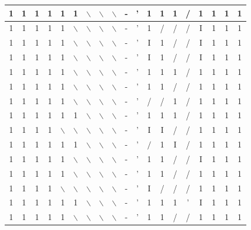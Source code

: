 \documentclass[10pt]{article}
\begin{document}
\begin{center}
\begin{tabular}{|c|c|c|c|c|c|c|c|c|c|c|c|c|c|c|c|c|c|c|}
\hline
1 & 1 & 1 & 1 & 1 & 1 & $\backslash$ & $\backslash$ & $\backslash$ & - & ' & 1 & 1 & 1 & / & 1 & 1 & 1 & 1 \\
\hline
1 & 1 & 1 & 1 & 1 & $\backslash$ & $\backslash$ & $\backslash$ & $\backslash$ & - & ' & 1 & / & / & / & I & 1 & 1 & 1 \\
\hline
1 & 1 & 1 & 1 & 1 & $\backslash$ & $\backslash$ & $\backslash$ & $\backslash$ & - & ' & I & 1 & / & / & I & 1 & 1 & 1 \\
\hline
1 & 1 & 1 & 1 & 1 & $\backslash$ & $\backslash$ & $\backslash$ & $\backslash$ & - & ' & I & 1 & / & / & I & 1 & 1 & 1 \\
\hline
1 & 1 & 1 & 1 & 1 & $\backslash$ & $\backslash$ & $\backslash$ & $\backslash$ & - & ' & 1 & 1 & 1 & / & 1 & 1 & 1 & 1 \\
\hline
1 & 1 & 1 & 1 & 1 & $\backslash$ & $\backslash$ & $\backslash$ & $\backslash$ & - & ' & 1 & 1 & / & / & 1 & 1 & 1 & 1 \\
\hline
1 & 1 & 1 & 1 & 1 & $\backslash$ & $\backslash$ & $\backslash$ & $\backslash$ & - & ' & / & / & 1 & / & 1 & 1 & 1 & 1 \\
\hline
1 & 1 & 1 & 1 & 1 & 1 & $\backslash$ & $\backslash$ & $\backslash$ & - & ' & 1 & 1 & 1 & / & 1 & 1 & 1 & 1 \\
\hline
1 & 1 & 1 & 1 & $\backslash$ & $\backslash$ & $\backslash$ & $\backslash$ & $\backslash$ & - & ' & I & I & / & / & 1 & 1 & 1 & 1 \\
\hline
1 & 1 & 1 & 1 & 1 & 1 & $\backslash$ & $\backslash$ & $\backslash$ & - & ' & $/$ & 1 & I & / & 1 & 1 & 1 & 1 \\
\hline
1 & 1 & 1 & 1 & 1 & $\backslash$ & $\backslash$ & $\backslash$ & $\backslash$ & - & ' & 1 & 1 & / & / & I & 1 & 1 & 1 \\
\hline
1 & 1 & 1 & 1 & 1 & $\backslash$ & $\backslash$ & $\backslash$ & $\backslash$ & - & ' & 1 & 1 & / & / & 1 & 1 & 1 & 1 \\
\hline
1 & 1 & 1 & 1 & $\backslash$ & $\backslash$ & $\backslash$ & $\backslash$ & $\backslash$ & - & ' & I & / & / & / & 1 & 1 & 1 & 1 \\
\hline
1 & 1 & 1 & 1 & 1 & 1 & $\backslash$ & $\backslash$ & $\backslash$ & - & ' & 1 & 1 & 1 & ' & I & 1 & 1 & 1 \\
\hline
1 & 1 & 1 & 1 & 1 & $\backslash$ & $\backslash$ & $\backslash$ & $\backslash$ & - & ' & 1 & 1 & / & / & 1 & 1 & 1 & 1 \\

\end{tabular}
\end{center}
\end{document}
